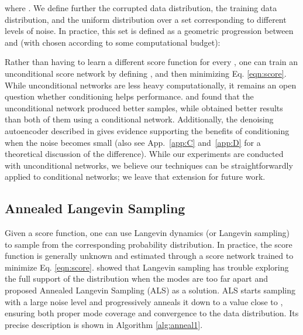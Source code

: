 \documentclass{article} \usepackage{iclr2021_conference_notitle,times}
\theoremstyle{definition}
\theoremstyle{definition}
\begin{document}
where . We define further   the corrupted data distribution,  the training data distribution, and  the uniform distribution over a set  corresponding to different levels of noise.
In practice, this set is defined as a geometric progression between  and  (with  chosen according to some computational budget):



Rather than having to learn a different score function for every , one can train an unconditional score network by defining , and then minimizing Eq. \ref{eqn:score}. While unconditional networks are less heavy computationally, it remains an open question whether conditioning helps performance. \citet{li2019learning} and \citet{song2020improved} found that the unconditional network produced better samples, while \citet{ho2020denoising} obtained better results than both of them using a conditional network. Additionally, the denoising autoencoder described in \citet{AR-DAE} gives evidence supporting the benefits of conditioning when the noise becomes small (also see App.~\ref{app:C} and~\ref{app:D} for a theoretical discussion of the difference).
While our experiments are conducted with unconditional networks, we believe our techniques can be straightforwardly applied to conditional networks; we leave that extension for future work.

\subsection{Annealed Langevin Sampling}

Given a score function, one can use Langevin dynamics (or Langevin sampling) \citep{welling2011bayesian} to sample from the corresponding probability distribution. In practice, the score function is generally unknown and estimated through a score network trained to minimize Eq. \ref{eqn:score}. \citet{song2019generative} showed that Langevin sampling has trouble exploring the full support of the distribution when the modes are too far apart and proposed Annealed Langevin Sampling (ALS) as a solution. ALS starts sampling with a large noise level and progressively anneals it down to a value close to , ensuring both proper mode coverage and convergence to the data distribution. Its precise description is shown in Algorithm \ref{alg:anneal1}. 
\end{document}
